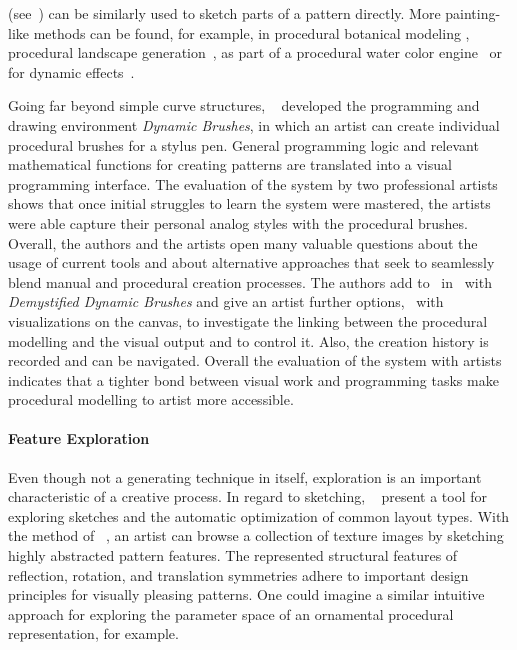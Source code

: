 \cite{gieseke_2017_ooo, kazi_2012_vit, xing_2014_apr, xing_2015_aha} (see~) can be similarly used to sketch parts of a pattern directly. More painting-like methods can be found, for example, in procedural botanical modeling \cite{anastacio_2008_spl,chen_2008_stm,palubicki_2009_sot}, procedural landscape generation~\cite{emilien_2015_wie}, as part of a procedural water color engine~\cite{diverdi_2013_ppp} or for dynamic effects~\cite{xing_2016_eit}. 


Going far beyond simple curve structures, \citeauthor*{jacobs_2018_dbe}~\cite{jacobs_2018_dbe} developed the programming and drawing environment \textit{Dynamic Brushes}, in which an artist can create individual procedural brushes for a stylus pen. General programming logic and relevant mathematical functions for creating patterns are translated into a visual programming interface. The evaluation of the system by two professional artists shows that once initial struggles to learn the system were mastered, the artists were able capture their personal analog styles with the procedural brushes. Overall, the authors and the artists open many valuable questions about the usage of current tools and about alternative approaches that seek to seamlessly blend manual and procedural creation processes. The authors add to~\cite{jacobs_2018_dbe} in~\cite{li_2020_sva} with \textit{Demystified Dynamic Brushes} and give an artist further options, \eg~with visualizations on the canvas, to investigate the linking between the procedural modelling and the visual output and to control it. Also, the creation history is recorded and can be navigated. Overall the evaluation of the system with artists indicates that a tighter bond between visual work and programming tasks make procedural modelling to artist more accessible.


\paragraph*{Feature Exploration}
\label{para:analysis_rulebased_exploration}

Even though not a generating technique in itself, exploration is an important characteristic of a creative process. In regard to sketching, \citeauthor*{todi_2016_sse}~\cite{todi_2016_sse} present a tool for exploring sketches and the automatic optimization of common layout types. With the method of \citeauthor*{chen_2016_msi}~\cite{chen_2016_msi}, an artist can browse a collection of texture images by sketching highly abstracted pattern features. The represented structural features of reflection, rotation, and translation symmetries adhere to important design principles for visually pleasing patterns. One could imagine a similar intuitive approach for exploring the parameter space of an ornamental procedural representation, for example.

